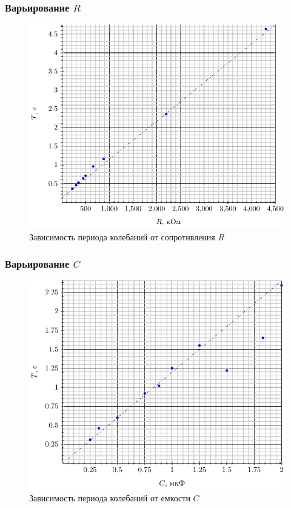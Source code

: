\subsubsection{Варьирование $R$}

\begin{figure}[H]
	\centering
	\includegraphics[width=\textwidth]{T_R}
	\caption{Зависимость периода колебаний от сопротивления $R$}
	\label{fig:figure1}
\end{figure}
\subsubsection{Варьирование $C$}

\begin{figure}[H]
	\centering
	\includegraphics[width=\textwidth]{T_C}
	\caption{Зависимость периода колебаний от емкости $C$}
	\label{fig:figure1}
\end{figure} 
